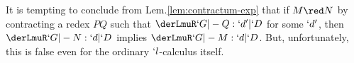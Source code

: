 \documentclass{CSML}
\begin{document}
%
%
%
 

\noindent It is tempting to conclude from Lem.\skp\ref{lem:contractum-exp} that if $M \red N$ by contracting a redex $PQ$ such that $ \derLmuR `G |- Q : `d' | `D $ for some $`d'$, then $ \derLmuR `G |- N : `d | `D $ implies $ \derLmuR `G |- M : `d | `D $. 
But, unfortunately, this is false even for the ordinary $`l$-calculus itself. 
\end{document}
